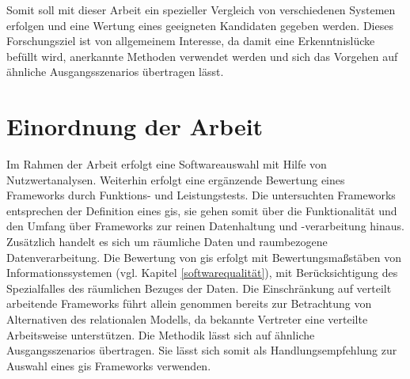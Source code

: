 Somit soll mit dieser Arbeit ein spezieller Vergleich von verschiedenen Systemen erfolgen und eine Wertung eines geeigneten Kandidaten gegeben werden.
Dieses Forschungsziel ist von allgemeinem Interesse, da damit eine Erkenntnislücke befüllt wird, anerkannte Methoden verwendet werden und sich das Vorgehen auf ähnliche Ausgangsszenarios übertragen lässt.

\section{Einordnung der Arbeit}
Im Rahmen der Arbeit erfolgt eine Softwareauswahl mit Hilfe von Nutzwertanalysen.
Weiterhin erfolgt eine ergänzende Bewertung eines Frameworks durch Funktions- und Leistungstests.
Die untersuchten Frameworks entsprechen der Definition eines \Gls{gis}, sie gehen somit über die Funktionalität und den Umfang über Frameworks zur reinen Datenhaltung und -ver\-ar\-beitung hinaus.
Zusätzlich handelt es sich um räumliche Daten und raumbezogene Datenverarbeitung.
Die Bewertung von \Gls{gis} erfolgt mit Bewertungsmaßstäben von Informationssystemen (vgl. Kapitel \ref{softwarequalität}), mit Berücksichtigung des Spezialfalles des räumlichen Bezuges der Daten.
Die Einschränkung auf verteilt arbeitende Frameworks führt allein genommen bereits zur Betrachtung von Alternativen des relationalen Modells, da bekannte Vertreter eine verteilte Arbeitsweise unterstützen.
Die Methodik lässt sich auf ähnliche Ausgangsszenarios übertragen.
Sie lässt sich somit als Handlungsempfehlung zur Auswahl eines \Gls{gis} Frameworks verwenden.

